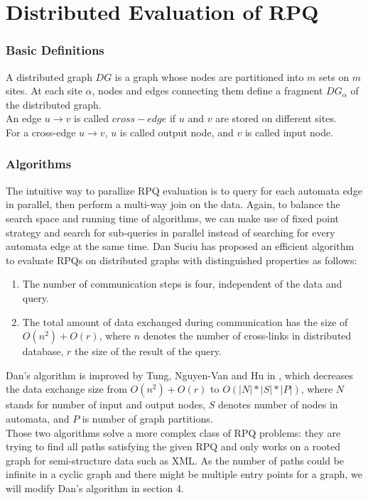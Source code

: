 \section{Distributed Evaluation of RPQ}
\subsubsection{Basic Definitions}
A distributed graph $DG$ is a graph whose nodes are partitioned into $m$ sets on $m$ sites. At each site $\alpha$, nodes and edges connecting them define a fragment $DG_\alpha$ of the distributed graph.\\
An edge $u\to v$ is called $cross-edge$ if $u$ and $v$ are stored on different sites.\\
For a cross-edge $u\to v$, $u$ is called output node, and $v$ is called input node.
\subsubsection{Algorithms}
The intuitive way to parallize RPQ evaluation is to query for each automata edge in parallel, then perform a multi-way join on the data. Again, to balance the search space and running time of algorithms, we can make use of fixed point strategy and search for sub-queries in parallel instead of searching for every automata edge at the same time. Dan Suciu has proposed an efficient algorithm\cite{suciu2002distributed} to evaluate RPQs on distributed graphs with distinguished properties as follows:
\begin{enumerate}
\item The number of communication steps is four, independent of the data and query.
\item The total amount of data exchanged during communication has the size of $O(n^2)+O(r)$, where 
$n$ denotes the number of cross-links in distributed database, $r$ the size of the result of the query.
\end{enumerate}
Dan's algorithm is improved by Tung, Nguyen-Van and Hu in \cite{tung2013efficient}, which decreases the data exchange size from $O(n^2)+O(r)$ to $O(|N|*|S|*|P|)$, where $N$ stands for number of input and output nodes, $S$ denotes number of nodes in automata, and $P$ is number of graph partitions.\\
Those two algorithms solve a more complex class of RPQ problems: they are trying to find all paths satisfying the given RPQ and only works on a rooted graph for semi-structure data such as XML. As the number of paths could be infinite in a cyclic graph and there might be multiple entry points for a graph, we will modify Dan's algorithm in section 4.
